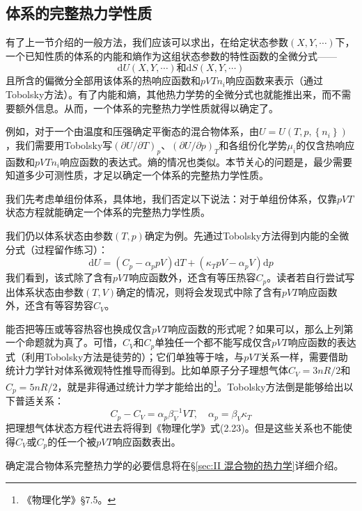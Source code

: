 \documentclass[main.tex]{subfiles}
\begin{document}
\subsection{体系的完整热力学性质}
有了上一节介绍的一般方法，我们应该可以求出，在给定状态参数$\left(X,Y,\cdots\right)$下，一个已知性质的体系的内能和熵作为这组状态参数的特性函数的全微分式——
\[\mathrm{d}U\left(X,Y,\cdots\right)\text{和}\mathrm{d}S\left(X,Y,\cdots\right)\]
且所含的偏微分全部用该体系的热响应函数和$pVTn_i$响应函数来表示（通过Tobolsky方法）。有了内能和熵，其他热力学势的全微分式也就能推出来，而不需要额外信息。从而，一个体系的完整热力学性质就得以确定了。

例如，对于一个由温度和压强确定平衡态的混合物体系，由$U=U\left(T,p,\left\{n_i\right\}\right)$，我们需要用Tobolsky写$\left(\partial U/\partial T\right)_{p}$、$\left(\partial U/\partial p\right)_T$和各组份化学势$\mu_i$的仅含热响应函数和$pVTn_i$响应函数的表达式。熵的情况也类似。本节关心的问题是，最少需要知道多少可测性质，才足以确定一个体系的完整热力学性质。

我们先考虑单组份体系，具体地，我们否定以下说法：对于单组份体系，仅靠$pVT$状态方程就能确定一个体系的完整热力学性质。

我们仍以体系状态由参数$\left(T,p\right)$确定为例。先通过Tobolsky方法得到内能的全微分式（过程留作练习）：
\[\mathrm{d}U=\left(C_p-\alpha_ppV\right)\mathrm{d}T+\left(\kappa_TpV-\alpha_pV\right)\mathrm{d}p\]
我们看到，该式除了含有$pVT$响应函数外，还含有等压热容$C_p$。读者若自行尝试写出体系状态由参数$\left(T,V\right)$确定的情况，则将会发现式中除了含有$pVT$响应函数外，还含有等容势容$C_V$。

能否把等压或等容热容也换成仅含$pVT$响应函数的形式呢？如果可以，那么上列第一个命题就为真了。可惜，$C_V$和$C_p$单独任一个都不能写成仅含$pVT$响应函数的表达式（利用Tobolsky方法是徒劳的）；它们单独等于啥，与$pVT$关系一样，需要借助统计力学针对体系微观特性推导而得到。比如单原子分子理想气体$C_V=3nR/2$和$C_p=5nR/2$，就是非得通过统计力学才能给出的\footnote{《物理化学》\S7.5。}。Tobolsky方法倒是能够给出以下普适关系：
\[C_p-C_V=\alpha_p\beta_V^{-1}VT,\quad\alpha_p=\beta_V\kappa_T\]
把理想气体状态方程代进去将得到《物理化学》式(2.23)。但是这些关系也不能使得$C_V$或$C_p$的任一个被$pVT$响应函数表出。

确定混合物体系完整热力学的必要信息将在\S\ref{sec:II 混合物的热力学}详细介绍。
\end{document}
